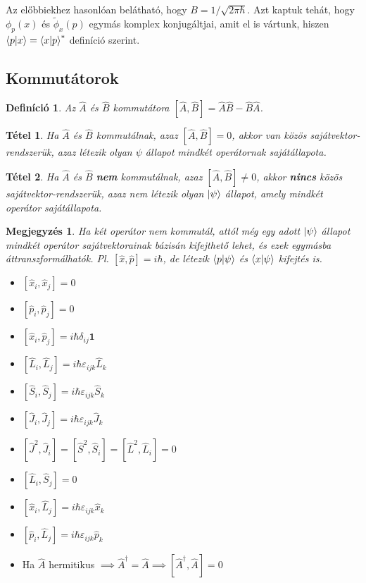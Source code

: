 \documentclass[12pt]{article}
\theoremstyle{plain}
\newcommand{\commut}[2]{\left [ #1 , #2 \right]}
\newtheorem*{theorem*}{Tétel}
\newtheorem*{def*}{Definíció}
\newtheorem*{megj}{Megjegyzés}
\begin{document}
Az előbbiekhez hasonlóan belátható, hogy $B=1/\sqrt{2\pi\hbar}$. Azt kaptuk tehát, hogy $\phi_p(x)$ és $\tilde\phi_x(p)$ egymás komplex konjugáltjai,
amit el is vártunk, hiszen $\braket{p|x}=\braket{x|p}^{*}$ definíció szerint.


\subsection{Kommutátorok}
\begin{def*}
    Az $\hat A$ és $\hat B$ kommutátora $\commut{\hat A}{\hat B} = \hat A \hat B - \hat B \hat A$. 
\end{def*}
\begin{theorem*}
    Ha $\hat A$ és $\hat B$ kommutálnak, azaz $\commut{\hat A}{\hat B} = 0$, akkor van közös sajátvektor-rendszerük, azaz létezik olyan
    $\psi$ állapot mindkét operátornak sajátállapota.
\end{theorem*}
\begin{theorem*}
    Ha $\hat A$ és $\hat B$ \textbf{nem} kommutálnak, azaz $\commut{\hat A}{\hat B} \neq 0$, akkor \textbf{nincs} közös sajátvektor-rendszerük, azaz nem 
    létezik olyan $\ket\psi$ állapot, amely mindkét operátor sajátállapota.
\end{theorem*}
\begin{megj}
    Ha két operátor nem kommutál, attól még egy adott $\ket\psi$ állapot mindkét operátor sajátvektorainak bázisán kifejthető lehet,
    és ezek egymásba áttranszformálhatók. Pl. $\commut{\hat x}{\hat p} = i\hbar$, de létezik $\braket{p|\psi}$ és $\braket{x|\psi}$
    kifejtés is.
\end{megj}
\begin{itemize}
    \item $\commut{\hat x_i}{\hat x_j} = 0$
    \item $\commut{\hat p_i}{\hat p_j} = 0$
    \item $\commut{\hat x_i}{\hat p_j} = i\hbar \delta_{ij}\mathbf 1$
    \item $\commut{\hat L_i}{\hat L_j} = i \hbar \varepsilon_{ijk}\hat L_k$
    \item $\commut{\hat S_i}{\hat S_j} = i \hbar \varepsilon_{ijk}\hat S_k$
    \item $\commut{\hat J_i}{\hat J_j} = i \hbar \varepsilon_{ijk}\hat J_k$
    \item $\commut{\hat J^2}{\hat J_i} = \commut{\hat S^2}{\hat S_i} = \commut{\hat L^2}{\hat L_i} = 0$
    \item $\commut{\hat L_i}{\hat S_j} = 0$
    \item $\commut{\hat x_i}{\hat L_j} = i \hbar \varepsilon_{ijk}\hat x_k$
    \item $\commut{\hat p_i}{\hat L_j} = i \hbar \varepsilon_{ijk}\hat p_k$    
    \item Ha $\hat A$ hermitikus $\implies \hat A^\dag = \hat A \implies \commut{\hat A^\dag}{\hat A} = 0$  
    
    
\end{itemize}
\end{document}
